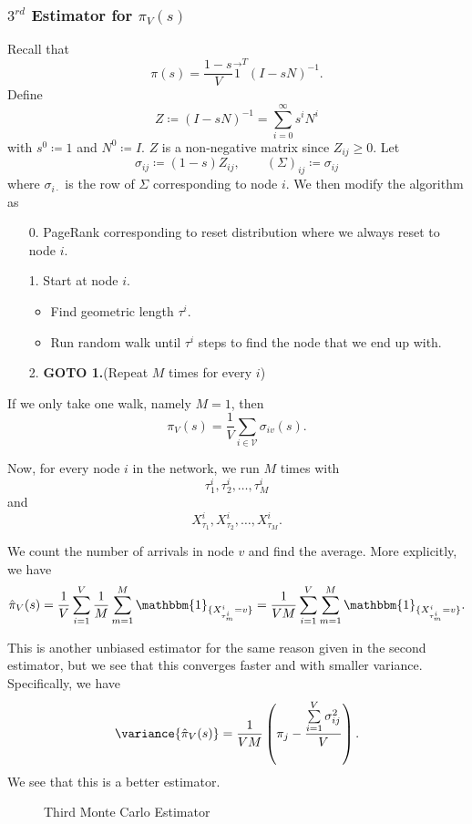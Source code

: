 \subsubsection{\(3^{rd}\) Estimator for \(\pi_V(s)\)}
Recall that
\[
	\pi(s) = \frac{1 - s}{V}\vec{1}^{T} (I - sN)^{-1}.
\]
Define
\[
	Z \coloneqq (I - sN)^{-1} = \sum\limits_{i=0}^{\infty} s^i N^i
\]
with \(s^0\coloneqq 1\) and \(N^0\coloneqq I\). \(Z\) is a non-negative matrix since \(Z_{ij}\geq 0\).
Let
\[
	\sigma_{ij}\coloneqq (1 - s)Z_{ij} , \qquad \left(\Sigma\right)_{ij}\coloneqq \sigma_{ij}
\]
where \(\sigma_{i\cdot}\) is the row of \(\Sigma\) corresponding to node \(i\). We then modify the algorithm as
\begin{enumerate}
	\item[0.] PageRank corresponding to reset distribution where we always reset to node \(i\).
	\item[1.] Start at node \(i\).
		\begin{itemize}
			\item Find geometric length \(\tau^i\).
			\item Run random walk until \(\tau^i\) steps to find the node that we end up with.
		\end{itemize}
	\item[2.] \textbf{GOTO 1.}(Repeat \(M\) times for every \(i\))
\end{enumerate}

If we only take one walk, namely \(M = 1\), then
\[
	\pi_V(s) = \frac{1}{V}\sum\limits_{i\in\mathcal{V}}\sigma_{iv}(s).
\]

Now, for every node \(i\) in the network, we run \(M\) times with
\[
	\tau^i_1, \tau^i_2, \ldots , \tau^i_M
\]
and
\[
	X_{\tau_1}^i, X_{\tau_2}^i, \ldots , X_{\tau_M}^i.
\]

We count the number of arrivals in node \(v\) and find the average. More explicitly, we have
\[
	\hat{\pi}_V(s) = \frac{1}{V}\sum\limits_{i=1}^{V} \frac{1}{M}\sum\limits_{m=1}^{M} \mathbbm{1}_{\{X^i_{\tau^i_m} = v\}} = \frac{1}{VM}\sum\limits_{i=1}^{V} \sum\limits_{m=1}^{M} \mathbbm{1}_{\{X^i_{\tau^i_m} = v\}} .
\]

This is another unbiased estimator for the same reason given in the second estimator, but we see that this converges faster and with smaller variance. Specifically, we have
\[
	\variance{\hat{\pi}_V(s)} = \frac{1}{VM}\left(\pi_{j} - \frac{\sum\limits_{i=1}^{V} \sigma_{ij}^2}{V}\right).
\]
We see that this is a better estimator.

\begin{figure}[H]
	\centering
	\caption{Third Monte Carlo Estimator}
	\label{fig:Monte-Carlo-Estimator-3}
\end{figure}